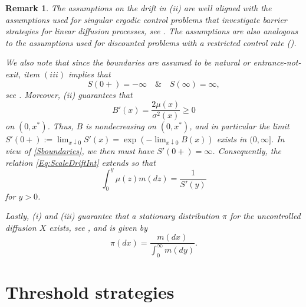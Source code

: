 \documentclass[12pt]{article}
\newtheorem{remark}[theorem]{Remark}
\begin{document}
\begin{remark}
    The assumptions on the drift in (ii) are well aligned with the assumptions used for singular ergodic control problems that investigate barrier strategies for linear diffusion processes, see \citep{Alvarez2018,AlvarezHening2022,Christensen2025}. The assumptions are also analogous to the assumptions used for discounted problems with a restricted control rate (\citep{Alvarez1998, Ekstrom2023, Guerin2024}).

    We also note that 
    since the boundaries are assumed to be natural or entrance-not-exit, item $(iii)$ implies that  
    \begin{equation}\label{Sboundaries}
     S(0+)=-\infty \quad \&\quad S(\infty)=\infty,
    \end{equation} 
    see \citep[p. 234]{Karlin1981}.
    Moreover, (ii) guarantees that 
    \begin{equation*}
        B'(x) = \frac{2 \mu(x)}{\sigma^2(x)} \geq 0
    \end{equation*}
    on $(0,x^*)$.
    Thus, $B$ is nondecreasing on $(0,x^*)$, and in particular the limit $S'(0+):=\lim_{x \downarrow 0}  S'(x) = \exp (- \lim_{x \downarrow 0} B(x))$ exists in $(0, \infty]$. In view of \eqref{Sboundaries}, we then must have $S'(0+)=  \infty$.
    Consequently, the relation \eqref{Eq:ScaleDriftInt} extends so that
\begin{equation}\label{Eq:ScaleDriftInt0}   \int_0^y \mu(z)m(dz) = \frac{1}{S'(y)}
    \end{equation}
    for $y>0$.
    
    Lastly, (i) and (iii) guarantee that a stationary distribution $\pi$ for the uncontrolled diffusion $X$ exists, see \cite[p. 37]{BorodinSalminen}, and is given by
    \begin{equation*}
        \pi(dx) = \frac{m(dx)}{\int_0^{\infty} m(dy)}.
    \end{equation*} 
\end{remark}

\section{Threshold strategies}\label{sec:threshold}
\end{document}
